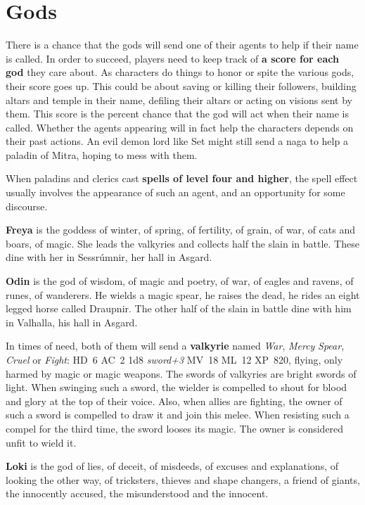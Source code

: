 \documentclass[11pt]{bxart}
\begin{document}
\section{Gods}

There is a chance that the gods will send one of their agents to help
if their name is called. In order to succeed, players need to keep
track of \textbf{a score for each god} they care about. As characters
do things to honor or spite the various gods, their score goes up.
This could be about saving or killing their followers, building altars
and temple in their name, defiling their altars or acting on visions
sent by them. This score is the percent chance that the god will act
when their name is called. Whether the agents appearing will in fact
help the characters depends on their past actions. An evil demon lord
like Set might still send a naga to help a paladin of Mitra, hoping to
mess with them.

When paladins and clerics cast \textbf{spells of level four and
  higher}, the spell effect usually involves the appearance of such an
agent, and an opportunity for some discourse.

\textbf{Freya} is the goddess of winter, of spring, of fertility, of
grain, of war, of cats and boars, of magic. She leads the valkyries
and collects half the slain in battle. These dine with her in
Sessrúmnir, her hall in Asgard.

\textbf{Odin} is the god of wisdom, of magic and poetry, of war, of
eagles and ravens, of runes, of wanderers. He wields a magic spear, he
raises the dead, he rides an eight legged horse called Draupnir. The
other half of the slain in battle dine with him in Valhalla, his hall
in Asgard.

In times of need, both of them will send a \textbf{valkyrie} named
\textit{War}, \textit{Mercy} \textit{Spear}, \textit{Cruel} or
\textit{Fight}: HD~6 AC~2 1d8 \textit{sword+3} MV~18 ML~12 XP~820,
flying, only harmed by magic or magic weapons. The swords of valkyries
are bright swords of light. When swinging such a sword, the wielder is
compelled to shout for blood and glory at the top of their voice.
Also, when allies are fighting, the owner of such a sword is compelled
to draw it and join this melee. When resisting such a compel for the
third time, the sword looses its magic. The owner is considered unfit
to wield it.

\textbf{Loki} is the god of lies, of deceit, of misdeeds, of excuses
and explanations, of looking the other way, of tricksters, thieves and
shape changers, a friend of giants, the innocently accused, the
misunderstood and the innocent.
\end{document}
